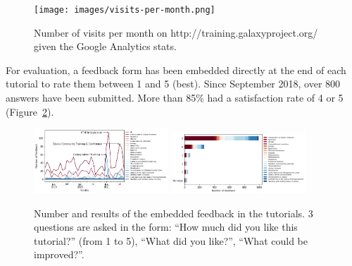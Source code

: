 \documentclass[10pt,letterpaper]{article}
\begin{document}
\begin{figure}[!ht]
	\centering
	\texttt{[image: images/visits-per-month.png]}
	\caption{Number of visits per month on http://training.galaxyproject.org/ given the Google Analytics stats.
    \label{fig:visits}}
\end{figure}

For evaluation, a feedback form has been embedded directly at the end of each tutorial to rate them between 1 and 5 (best). Since September 2018, over 800 answers have been submitted. More than 85\% had a satisfaction rate of 4 or 5 (Figure~\ref{fig:feedback}).

\begin{figure}[!ht]
	\centering
	\includegraphics[width=0.45\textwidth]{images/feedback.png}
	\includegraphics[width=0.45\textwidth]{images/feedback-scores.png}
	\caption{Number and results of the embedded feedback in the tutorials. 3 questions are asked in the form: ``How much did you like this tutorial?'' (from 1 to 5), ``What did you like?'', ``What could be improved?''.
    \label{fig:feedback}}
\end{figure}
\end{document}
